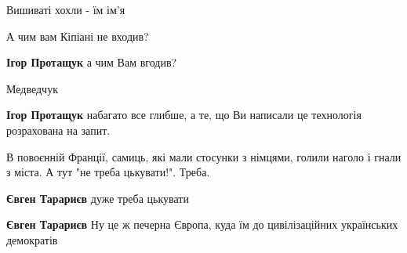 \begin{itemize}
Вишиваті хохли - їм ім'я

 
А чим вам Кіпіані не входив?

\begin{itemize}
 
\textbf{Ігор Протащук} а чим Вам вгодив?

 
Медведчук

 
\textbf{Ігор Протащук} набагато все глибше, а те, що Ви написали це технологія розрахована на запит.
\end{itemize}

 
В повоєнній Франції, самиць, які мали стосунки з німцями, голили наголо і гнали
з міста. А тут "не треба цькувати!". Треба.

\begin{itemize}
 
\textbf{Євген Тарариєв} дуже треба цькувати

 
\textbf{Євген Тарариєв} Ну це ж печерна Європа, куда їм до цивілізаційних українських демократів
\end{itemize}

\end{itemize}

